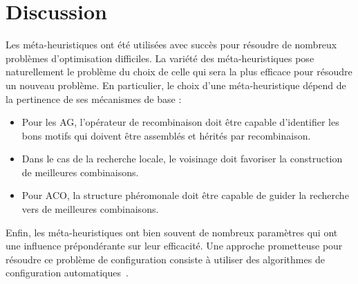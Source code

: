 \documentclass[12pt,a4paper]{book}
\begin{document}
\section{Discussion}
\label{sec:discussion}

Les méta-heuristiques ont été utilisées avec succès pour résoudre de nombreux problèmes d'optimisation difficiles. La variété des méta-heuristiques pose naturellement le problème du choix de celle qui sera la plus efficace pour résoudre un nouveau problème. En particulier, le choix d'une méta-heuristique dépend de la pertinence de ses mécanismes de base :
\begin{itemize}
  \item Pour les AG, l'opérateur de recombinaison doit être capable d'identifier les bons motifs qui doivent être assemblés et hérités par recombinaison.
  \item Dans le cas de la recherche locale, le voisinage doit favoriser la construction de meilleures combinaisons.
  \item Pour ACO, la structure phéromonale doit être capable de guider la recherche vers de meilleures combinaisons.
\end{itemize}

Enfin, les méta-heuristiques ont bien souvent de nombreux paramètres qui ont une influence prépondérante sur leur efficacité. Une approche prometteuse pour résoudre ce problème de configuration consiste à utiliser des algorithmes de configuration automatiques~\cite{xu2010}.
\end{document}
